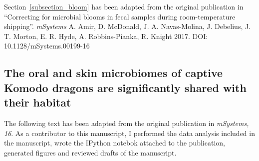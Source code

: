 Section~\ref{subsection_bloom} has been adapted from the original publication in
``Correcting for microbial blooms in fecal samples during room-temperature shipping''.
\emph{mSystems} A. Amir, D. McDonald, J. A. Navas-Molina, J. Debelius, J. T. Morton,
E. R. Hyde, A. Robbins-Pianka, R. Knight 2017. DOI: 10.1128/mSystems.00199-16

\subsection{The oral and skin microbiomes of captive Komodo dragons are significantly shared with their habitat}\label{subsection_komodo}

The following text has been adapted from the original publication in
\textsl{mSystems, 16}. As a contributor to this manuscript, I performed the data
analysis included in the manuscript, wrote the IPython notebok \cite{Perez2007}
attached to the publication, generated figures and reviewed drafts of the manuscript.

